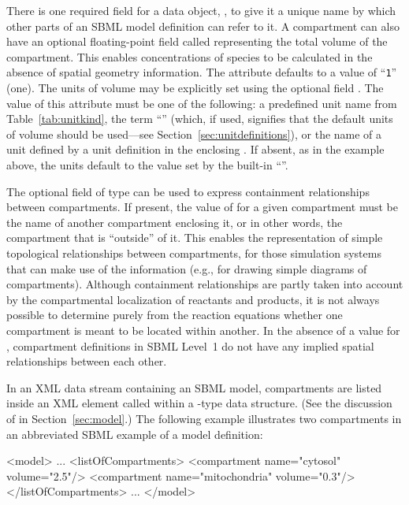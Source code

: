 \documentclass[10pt]{cekarticle}
\newenvironment{blockChanged}{\color{BrickRed}}{}
\begin{document}
\begin{blockChanged}
There is one required field for a  data object,
, to give it a unique name by which other parts of an SBML
model definition can refer to it.  A compartment can also have an optional
floating-point field called  representing the total volume
of the compartment.  This enables concentrations of species to be
calculated in the absence of spatial geometry information.%
\end{blockChanged}
The  attribute defaults to a value of ``\texttt{1}'' (one).
\begin{blockChanged}
The units of volume may be explicitly set using the optional field
.  The value of this attribute must be one of the following:
a predefined unit name from Table~\ref{tab:unitkind}, the term
``'' (which, if used, signifies that the default units of
volume should be used---see Section~\ref{sec:unitdefinitions}), or the
name of a unit defined by a unit definition in the enclosing
.  If absent, as in the example above, the units default to
the value set by the built-in ``''.
\end{blockChanged}

The optional field  of type  can be used to
express containment relationships between compartments.  If present, the
value of  for a given compartment
\begin{blockChanged}
must be the name of
another compartment enclosing it, or in other words, the compartment that
is ``outside'' of it.  This enables the representation of simple
topological relationships between compartments, for those simulation
systems that can make use of the information (e.g., for drawing simple
diagrams of compartments).  Although containment relationships are partly
taken into account by the compartmental localization of reactants and
products, it is not always
\end{blockChanged}
\begin{blockChanged} possible to determine purely from the reaction
equations whether one compartment is meant to be located within another.
In the absence of a value for , compartment definitions in
SBML Level~1 do not have any implied spatial relationships between each
other.
\end{blockChanged}

In an XML data stream containing an SBML model, compartments are listed
inside an XML element called  within a
-type data structure.  (See the discussion of  in
Section~\ref{sec:model}.)  The following example illustrates two
compartments in an abbreviated SBML example of a model definition:
\begin{example}
<model>
    ...
    <listOfCompartments>
        <compartment name="cytosol" volume="2.5"/>
        <compartment name="mitochondria" volume="0.3"/>
    </listOfCompartments>
    ...
</model>
\end{example}
\end{document}
